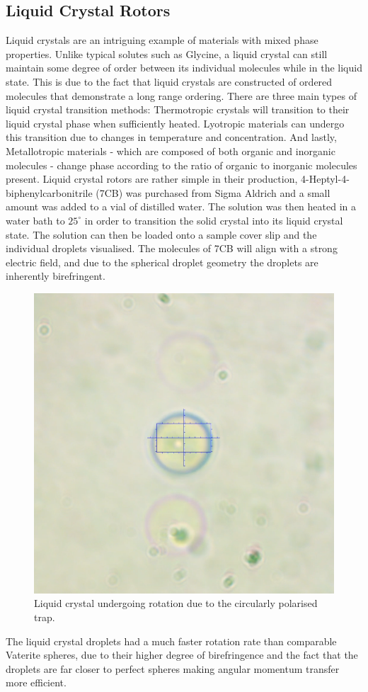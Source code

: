\subsection{Liquid Crystal Rotors}
Liquid crystals are an intriguing example of materials with mixed phase
properties. Unlike typical solutes such as Glycine, a liquid crystal
can still maintain some degree of order between its individual molecules
while in the liquid state. This is due to the fact that liquid crystals
are constructed of ordered molecules that demonstrate a long range
ordering. There are three main types of liquid crystal transition methods:
Thermotropic crystals will transition to their liquid crystal phase when 
sufficiently heated. Lyotropic materials can undergo this transition due 
to changes in temperature and concentration. And lastly, Metallotropic 
materials - which are composed of both organic and inorganic molecules - 
change phase according to the ratio of organic to inorganic molecules present.
Liquid crystal rotors are rather simple in their production, 
4-Heptyl-4-biphenylcarbonitrile (7CB) was purchased from Sigma Aldrich
and a small amount was added to a vial of distilled water. The solution 
was then heated in a water bath to $25^\circ$ in order to transition the
solid crystal into its liquid crystal state. The solution can then be 
loaded onto a sample cover slip and the individual droplets visualised.
The molecules of 7CB will align with a strong electric field, and due to
the spherical droplet geometry the droplets are inherently birefringent. 
\begin{figure}[h!]
	\centering
	\includegraphics[width=0.5\linewidth]{LC_sample.png}
	\caption{Liquid crystal undergoing rotation due to the circularly polarised trap.} 
\end{figure}

The liquid crystal droplets had a much faster rotation rate than comparable 
Vaterite spheres, due to their higher degree of birefringence and the fact
that the droplets are far closer to perfect spheres making angular momentum
transfer more efficient. 

